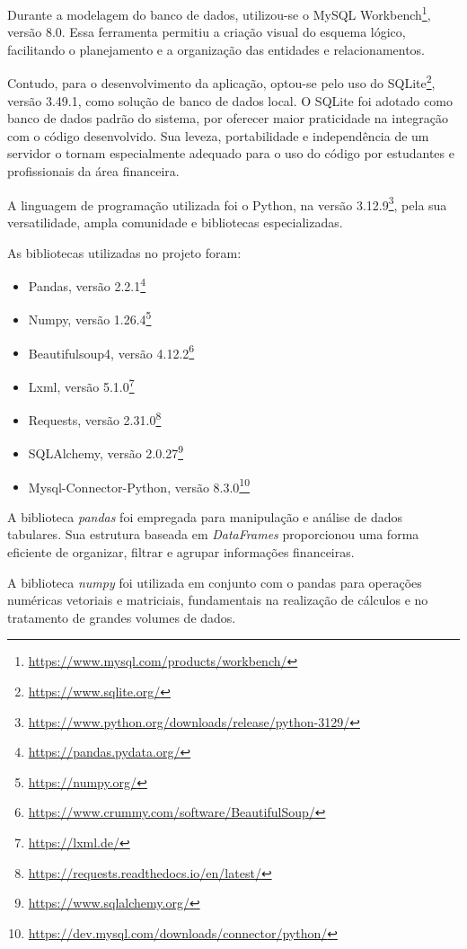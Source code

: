 \documentclass[recuosum=1.5cm]{iftex2024}
\begin{document}
Durante a modelagem do banco de dados, utilizou-se o MySQL Workbench\footnote{\url{https://www.mysql.com/products/workbench/}}, versão 8.0. Essa ferramenta permitiu a criação visual do esquema lógico, facilitando o planejamento e a organização das entidades e relacionamentos.

Contudo, para o desenvolvimento da aplicação, optou-se pelo uso do SQLite\footnote{\url{https://www.sqlite.org/}}, versão 3.49.1, como solução de banco de dados local. O SQLite foi adotado como banco de dados padrão do sistema, por oferecer maior praticidade na integração com o código desenvolvido. Sua leveza, portabilidade e independência de um servidor o tornam especialmente adequado para o uso do código por estudantes e profissionais da área financeira.

A linguagem de programação utilizada foi o Python, na versão 3.12.9\footnote{\url{https://www.python.org/downloads/release/python-3129/}}, pela sua versatilidade, ampla comunidade e bibliotecas especializadas.

As bibliotecas utilizadas no projeto foram:

\begin{itemize}
	\item Pandas, versão 2.2.1\footnote{\url{https://pandas.pydata.org/}}
	\item Numpy, versão 1.26.4\footnote{\url{https://numpy.org/}}
	\item Beautifulsoup4, versão 4.12.2\footnote{\url{https://www.crummy.com/software/BeautifulSoup/}}
	\item Lxml, versão 5.1.0\footnote{\url{https://lxml.de/}}
	\item Requests, versão 2.31.0\footnote{\url{https://requests.readthedocs.io/en/latest/}}
	\item SQLAlchemy, versão 2.0.27\footnote{\url{https://www.sqlalchemy.org/}}
	\item Mysql-Connector-Python, versão 8.3.0\footnote{\url{https://dev.mysql.com/downloads/connector/python/}}
\end{itemize}

A biblioteca \textit{pandas} foi empregada para manipulação e análise de dados tabulares. Sua estrutura baseada em \textit{DataFrames} proporcionou uma forma eficiente de organizar, filtrar e agrupar informações financeiras.

A biblioteca \textit{numpy} foi utilizada em conjunto com o pandas para operações numéricas vetoriais e matriciais, fundamentais na realização de cálculos e no tratamento de grandes volumes de dados.
\end{document}
